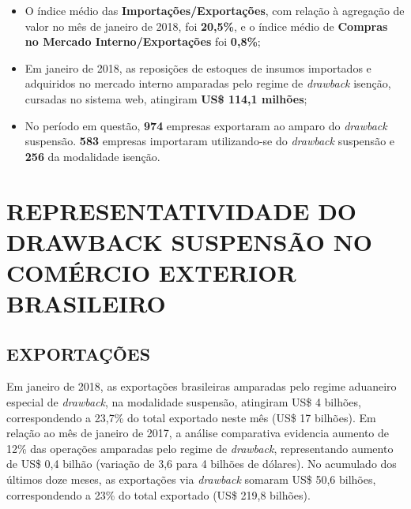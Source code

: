 \documentclass[12pt,a4paper,notitlepage]{report}
\begin{document}
\begin{itemize}
  foram: \textbf{(1) Minérios de ferro e seus concentrados}, \textbf{(2)
  Celulose} e \textbf{(3) Produtos semimanufaturados de ferro ou aços}.
  Os produtos mais importados, classificados de acordo com a Pauta de
  Produtos de importação (PPI) foram: \textbf{(1) Hulhas, mesmo em pó,
  mas não aglomeradas}, \textbf{(2) Partes e pecas para veículos
  automóveis e tratores} e \textbf{(3) Produtos laminados planos de
  ferro ou aços}. Para compras no mercado interno, destacaram-se:
  \textbf{(1) Coque de petróleo}, \textbf{(2) Produtos laminados planos
  de ferro ou aços} e \textbf{(3) Sabões, produtos e preparações, para
  limpeza};
\item
  O índice médio das \textbf{Importações/Exportações}, com relação à
  agregação de valor no mês de janeiro de 2018, foi \textbf{20,5\%}, e
  o índice médio de \textbf{Compras no Mercado Interno/Exportações} foi
  \textbf{0,8\%};
\item
  Em janeiro de 2018, as reposições de estoques de insumos importados e
  adquiridos no mercado interno amparadas pelo regime de \emph{drawback}
  isenção, cursadas no sistema web, atingiram \textbf{US\$ 114,1
  milhões};
\item
  No período em questão, \textbf{974} empresas exportaram ao amparo do
  \emph{drawback} suspensão. \textbf{583} empresas importaram
  utilizando-se do \emph{drawback} suspensão e \textbf{256} da
  modalidade isenção.
\end{itemize}

\newpage

\chapter{REPRESENTATIVIDADE DO DRAWBACK SUSPENSÃO NO COMÉRCIO EXTERIOR
BRASILEIRO}\label{representatividade-do-drawback-suspensao-no-comercio-exterior-brasileiro}

\section{EXPORTAÇÕES}\label{exportacoes}

Em janeiro de 2018, as exportações brasileiras amparadas pelo regime
aduaneiro especial de \emph{drawback}, na modalidade suspensão,
atingiram US\$ 4 bilhões, correspondendo a 23,7\% do total exportado
neste mês (US\$ 17 bilhões). Em relação ao mês de janeiro de 2017,
 a análise comparativa evidencia aumento de 12\% das operações
amparadas pelo regime de \emph{drawback}, representando aumento de US\$
0,4 bilhão (variação de 3,6 para 4 bilhões de dólares). No acumulado dos
últimos doze meses, as exportações via \emph{drawback} somaram US\$ 50,6
bilhões, correspondendo a 23\% do total exportado (US\$ 219,8 bilhões).
\end{document}
